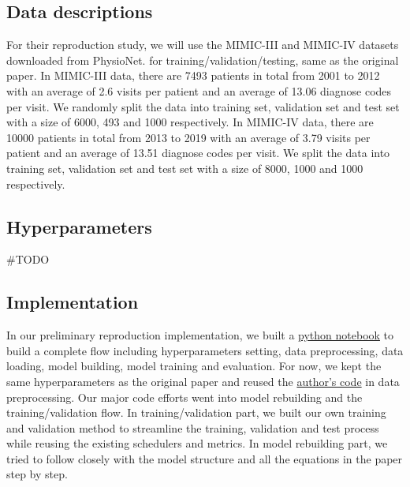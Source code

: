 \documentclass[11pt,a4paper,fleqn]{article}
\begin{document}
\subsection{Data descriptions}
For their reproduction study, we will use the MIMIC-III \cite{mimic3} and
MIMIC-IV \cite{mimic4} datasets downloaded from PhysioNet\cite{physionet}. for
training/validation/testing, same as the original paper. In MIMIC-III data,
there are 7493 patients in total from 2001 to 2012 with an average of 2.6 visits
per patient and an average of 13.06 diagnose codes per visit. We randomly split
the data into training set, validation set and test set with a size of 6000, 493
and 1000 respectively. In MIMIC-IV data, there are 10000 patients in total from
2013 to 2019 with an average of 3.79 visits per patient and an average of 13.51
diagnose codes per visit. We split the data into training set, validation set
and test set with a size of 8000, 1000 and 1000 respectively. 

\subsection{Hyperparameters}
\#TODO

\subsection{Implementation}
In our preliminary reproduction implementation, we built a
\href{https://github.com/willtsai/dlh-sp23-team53/blob/main/notebook.ipynb}{python
notebook} to build a complete flow including hyperparameters setting, data
preprocessing, data loading, model building, model training and evaluation. For
now, we kept the same hyperparameters as the original paper and reused the
\href{https://github.com/LuChang-CS/Chet}{author's code} in data preprocessing.
Our major code efforts went into model rebuilding and the training/validation
flow. In training/validation part, we built our own training and validation
method to streamline the training, validation and test process while reusing the
existing schedulers and metrics. In model rebuilding part, we tried to follow
closely with the model structure and all the equations in the paper step by
step.
\end{document}
